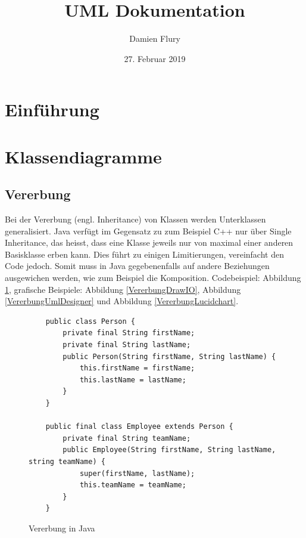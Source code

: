 \documentclass[a4paper, titlepage]{scrartcl}
\title{UML Dokumentation}
\author{Damien Flury}
\date{27. Februar 2019}
\begin{document}
    \maketitle
    \tableofcontents
    \newpage
    \section{Einführung}
    \section{Klassendiagramme}
    \subsection{Vererbung}
    Bei der Vererbung (engl. Inheritance) von Klassen werden Unterklassen generalisiert. Java
    verfügt im Gegensatz zu zum Beispiel C++ nur über Single Inheritance, das heisst, dass eine Klasse
    jeweils nur von maximal einer anderen Basisklasse erben kann. Dies führt zu einigen Limitierungen,
    vereinfacht den Code jedoch. Somit muss in Java gegebenenfalls auf andere Beziehungen ausgewichen werden,
    wie zum Beispiel die Komposition. Codebeispiel: Abbildung \ref{InheritanceJava}, grafische Beispiele: Abbildung \ref{VererbungDrawIO},
    Abbildung \ref{VererbungUmlDesigner} und Abbildung \ref{VererbungLucidchart}.

    \begin{figure}
        \begin{lstlisting}
    public class Person {
        private final String firstName;
        private final String lastName;
        public Person(String firstName, String lastName) {
            this.firstName = firstName;
            this.lastName = lastName;
        }        
    }

    public final class Employee extends Person {
        private final String teamName;
        public Employee(String firstName, String lastName, string teamName) {
            super(firstName, lastName);
            this.teamName = teamName;
        }
    }
        \end{lstlisting}
    \caption{Vererbung in Java}
    \label{InheritanceJava}
    \end{figure}
\end{document}

